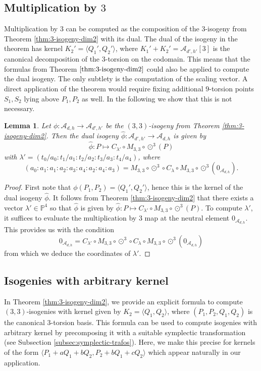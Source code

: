 \documentclass[11pt]{amsart}
\newtheorem{lemma}[theorem]{Lemma}
\theoremstyle{definition}
\newcommand{\A}{\mathcal{A}}
\newcommand{\PP}{\mathbb{P}}
\newcommand{\cube}{\odot^3}
\begin{document}
\subsection{Multiplication by $3$}

Multiplication by $3$ can be computed as the composition of the $3$-isogeny from Theorem \ref{thm:3-isogeny-dim2} with its dual. The dual of the isogeny in the theorem has kernel $K_2' = \langle Q_1',Q_2'\rangle$, where $K_1' + K_2' = \A_{d',h'}[3]$ is the canonical  decomposition of the $3$-torsion on the codomain. This means that the formulas from Theorem $\ref{thm:3-isogeny-dim2}$ could also be applied to compute the dual isogeny. The only subtlety is the computation of the scaling vector. A direct application of the theorem would require fixing additional $9$-torsion points $S_1,S_2$ lying above $P_1,P_2$ as well. In the following we show that this is not necessary.

\begin{lemma} \label{lem:dual-isogeny}
    Let $\phi: \A_{d,h} \to \A_{d',h'}$ be the $(3,3)$-isogeny from Theorem \ref{thm:3-isogeny-dim2}. Then the dual isogeny $\hat{\phi}: \A_{d',h'} \to \A_{d,h}$ is given by 
    \[
    \hat{\phi}: P \mapsto C_{\lambda'} \circ M_{3,3} \circ \cube (P)
    \]
    with $\lambda' = (t_0/a_0: t_1/a_1: t_2/a_2: t_3/a_3: t_4/a_4)$, where 
    \[
    (a_0:a_1:a_1:a_2:a_3:a_4:a_2:a_4:a_3) = M_{3,3} \circ \cube \circ C_{\lambda} \circ M_{3,3} \circ \cube(0_{\A_{d,h}}).
    \]
\end{lemma}

\begin{proof}
    First note that $\phi(P_1,P_2) = \langle Q_1',Q_2'\rangle$, hence this is the kernel of the dual isogeny $\hat{\phi}$. It follows from Theorem \ref{thm:3-isogeny-dim2} that there exists a vector $\lambda' \in \PP^4$ so that $\hat{\phi}$ is given by $\hat{\phi}: P \mapsto C_{\lambda'} \circ M_{3,3} \circ \cube (P)$. To compute $\lambda'$, it suffices to evaluate the multiplication by $3$ map at the neutral element $0_{\A_{d,h}}$. This provides us with the condition
   \[
   0_{\A_{d,h}} = C_{\lambda'} \circ M_{3,3} \circ \cube \circ C_{\lambda} \circ M_{3,3} \circ \cube(0_{\A_{d,h}})
    \]
    from which we deduce the coordinates of $\lambda'$.
\end{proof}


\subsection{Isogenies with arbitrary kernel}
In Theorem \ref{thm:3-isogeny-dim2}, we provide an explicit formula to compute $(3,3)$-isogenies with kernel given by $K_2 = \langle Q_1, Q_2 \rangle$, where $(P_1,P_2,Q_1,Q_2)$ is the canonical $3$-torsion basis. This formula can be used to compute isogenies with arbitrary kernel by precomposing it with a suitable symplectic transformation (see Subsection \ref{subsec:symplectic-trafos}). Here, we make this precise for kernels of the form $\langle P_1 + aQ_1 + bQ_2, P_2 + bQ_1 + cQ_2\rangle$ which appear naturally in our application. 
\end{document}
